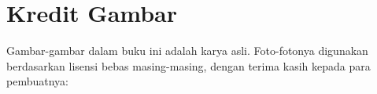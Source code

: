\chapter*{Kredit Gambar}

\begingroup\sloppy

Gambar-gambar dalam buku ini adalah karya asli. Foto-fotonya digunakan
berdasarkan lisensi bebas masing-masing, dengan terima kasih kepada
para pembuatnya:

